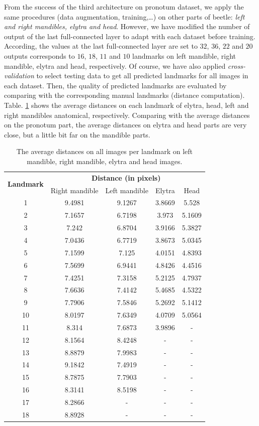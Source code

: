 \documentclass[review]{elsarticle}
\begin{document}
From the success of the third architecture on pronotum dataset, we apply the same procedures (data augmentation, training,\ldots) on other parts of beetle: \textit{left and right mandibles, elytra and head}. However, we have modified the number of output of the last full-connected layer to adapt with each dataset before training. According, the values at the last full-connected layer are set to $32$, $36$, $22$ and $20$ outputs corresponds to $16$, $18$, $11$ and $10$ landmarks on left mandible, right mandible, elytra and head, respectively. Of course, we have also applied \textit{cross-validation} to select testing data to get all predicted landmarks for all images in each dataset. Then, the quality of predicted landmarks are evaluated by comparing with the corresponding manual landmarks (distance computation). Table. \ref{tblavg4parts} shows the average distances on each landmark of elytra, head, left and right mandibles anatomical, respectively. Comparing with the average distances on the pronotum part, the average distances on elytra and head parts are very close, but a little bit far on the mandible parts.

\begin{table}[htbp]
	\centering	
	\begin{tabular}{|c|c|c|c|c|}
		\hline
		\multirow{2}{*}{\textbf{Landmark}} & \multicolumn{4}{|c|}{\textbf{Distance (in pixels)}} \\ \cline{2-5}
		 & Right mandible & Left mandible & Elytra & Head  \\ \hline
		1 & 9.4981 & 9.1267 & 3.8669 & 5.528  \\ \hline
2 & 7.1657 & 6.7198 & 3.973 & 5.1609  \\ \hline
3 & 7.242 & 6.8704 & 3.9166 & 5.3827 \\ \hline
4 & 7.0436 & 6.7719 & 3.8673 & 5.0345 \\ \hline
5 & 7.1599 & 7.125 & 4.0151 & 4.8393 \\ \hline
6 & 7.5699 & 6.9441 & 4.8426 & 4.4516 \\ \hline
7 & 7.4251 & 7.3158 & 5.2125 & 4.7937 \\ \hline
8 & 7.6636 & 7.4142 & 5.4685 & 4.5322 \\ \hline
9 & 7.7906 & 7.5846 & 5.2692 & 5.1412 \\ \hline
10 & 8.0197 & 7.6349 & 4.0709 & 5.0564 \\ \hline
11 & 8.314 & 7.6873 & 3.9896 & - \\ \hline
12 & 8.1564 & 8.4248 & - & - \\ \hline
13 & 8.8879 & 7.9983 & - & - \\ \hline
14 & 9.1842 & 7.4919 & - & - \\ \hline
15 & 8.7875 & 7.7903 & - & - \\ \hline
16 & 8.3141 & 8.5198 & - & - \\ \hline
17 & 8.2866 & - & - & - \\ \hline
18 & 8.8928 & - & - & - \\ \hline
	\end{tabular}
	\caption{The average distances on all images per landmark on left mandible, right mandible, elytra and head images.}
	\label{tblavg4parts}
\end{table}
\end{document}
